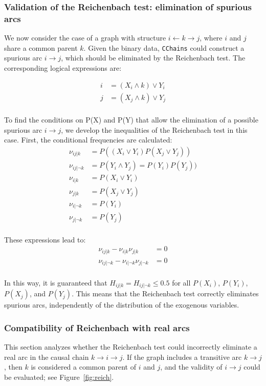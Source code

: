 \documentclass[12pt,a4paper]{report}
\begin{document}
\subsubsection*{Validation of the Reichenbach test: elimination of spurious arcs}

We now consider the case of a graph with structure \( i \leftarrow k \rightarrow j \), where \( i \) and \( j \) share a common parent \( k \). Given the binary data, \texttt{CChains} could construct a spurious arc \( i \to j \), which should be eliminated by the Reichenbach test. The corresponding logical expressions are:

\begin{align*}
i &= (X_i \land k) \lor Y_i \\
j &= (X_j \land k) \lor Y_j
\end{align*}
\\
To find the conditions on P(X) and P(Y) that allow the elimination of a possible spurious arc $ i \to j $, we develop the inequalities of the Reichenbach test in this case. First, the conditional frequencies are calculated:
\begin{align*}
\nu_{ij|k} &= P((X_i \lor Y_i)P(X_j \lor Y_j)) \\
\nu_{ij|\neg k} &= P(Y_i \land Y_j) = P(Y_i) P(Y_j)) \\
\nu_{i|k} &= P(X_i \lor Y_i)  \\ 
\nu_{j|k} &= P(X_j \lor Y_j)  \\
\nu_{i|\neg k} &= P(Y_i) \\
\nu_{j|\neg k} &= P(Y_j)
\end{align*}
\\
These expressions lead to:
\begin{align}
\nu_{ij|k} - \nu_{i|k} \nu_{j|k} &= 0 \\
\nu_{ij|\neg k} - \nu_{i|\neg k} \nu_{j|\neg k} &= 0
\end{align}
\\
In this way, it is guaranteed that \( H_{ij|k} = H_{ij|\neg k} \leq 0.5 \) for all $P(X_i)$, $P(Y_i)$, $P(X_j)$, and $P(Y_j)$. This means that the Reichenbach test correctly eliminates spurious arcs, independently of the distribution of the exogenous variables.

\subsubsection*{Compatibility of Reichenbach with real arcs}

This section analyzes whether the Reichenbach test could incorrectly eliminate a real arc in the causal chain \( k \to i \to j \). If the graph includes a transitive arc \( k \to j \), then \( k \) is considered a common parent of \( i \) and \( j \), and the validity of \( i \to j \) could be evaluated; see Figure~\ref{fig:reich}.
\end{document}
